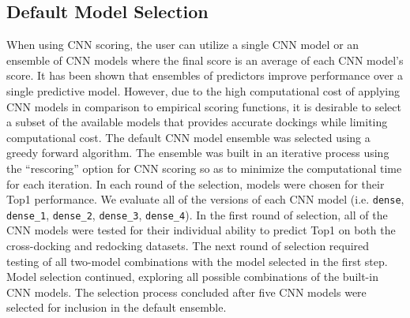 \documentclass[journal=jcisd8,manuscript=article]{achemso}
\begin{document}
\subsection{Default Model Selection}
When using CNN scoring, the user can utilize a single CNN model or an ensemble of CNN models where the final score is an average of each CNN model's score. It has been shown that ensembles of predictors improve performance over a single predictive model\cite{dietterich2000ensemble}. However, due to the high computational cost of applying CNN models in comparison to empirical scoring functions, it is desirable to select a subset of the available models that provides accurate dockings while limiting computational cost. The default CNN model ensemble was selected using a greedy forward algorithm. The ensemble was built in an iterative process using the ``rescoring'' option for CNN scoring so as to minimize the computational time for each iteration. In each round of the selection, models were chosen for their Top1 performance. We evaluate all of the versions of each CNN model (i.e. \texttt{dense}, \texttt{dense\_1}, \texttt{dense\_2}, \texttt{dense\_3}, \texttt{dense\_4}). In the first round of selection, all of the CNN models were tested for their individual ability to predict Top1 on both the cross-docking and redocking datasets. The next round of selection required testing of all two-model combinations with the model selected in the first step. Model selection continued, exploring all possible combinations of the built-in CNN models. The selection process concluded after five CNN models were selected for inclusion in the default ensemble.
\end{document}
